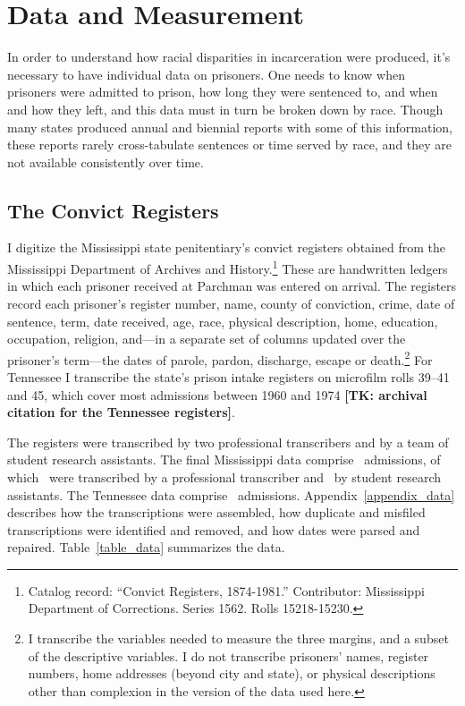 \documentclass[12pt]{article}
\begin{document}
\vspace*{-.1in}
\section*{Data and Measurement}
\vspace*{-.1in}

\noindent In order to understand how racial disparities in incarceration were produced, it's necessary to have individual data on prisoners.  One needs to know when prisoners were admitted to prison, how long they were sentenced to, and when and how they left, and this data must in turn be broken down by race.  Though many states produced annual and biennial reports with some of this information, these reports rarely cross-tabulate sentences or time served by race, and they are not available consistently over time.

\subsection*{The Convict Registers}

\noindent I digitize the Mississippi state penitentiary's convict registers obtained from the Mississippi Department of Archives and History.\footnote{Catalog record: ``Convict Registers, 1874-1981.'' Contributor: Mississippi Department of Corrections.  Series 1562.  Rolls 15218-15230.}  These are handwritten ledgers in which each prisoner received at Parchman was entered on arrival.  The registers record each prisoner's register number, name, county of conviction, crime, date of sentence, term, date received, age, race, physical description, home, education, occupation, religion, and---in a separate set of columns updated over the prisoner's term---the dates of parole, pardon, discharge, escape or death.\footnote{I transcribe the variables needed to measure the three margins, and a subset of the descriptive variables.  I do not transcribe prisoners' names, register numbers, home addresses (beyond city and state), or physical descriptions other than complexion in the version of the data used here.}  For Tennessee I transcribe the state's prison intake registers on microfilm rolls 39--41 and 45, which cover most admissions between 1960 and 1974 \textbf{[TK: archival citation for the Tennessee registers]}.

The registers were transcribed by two professional transcribers and by a team of student research assistants.  The final Mississippi data comprise \unskip~admissions, of which \unskip~were transcribed by a professional transcriber and \unskip~by student research assistants.  The Tennessee data comprise \unskip~admissions.  Appendix~\ref{appendix_data} describes how the transcriptions were assembled, how duplicate and misfiled transcriptions were identified and removed, and how dates were parsed and repaired.  Table~\ref{table_data} summarizes the data.
\end{document}

